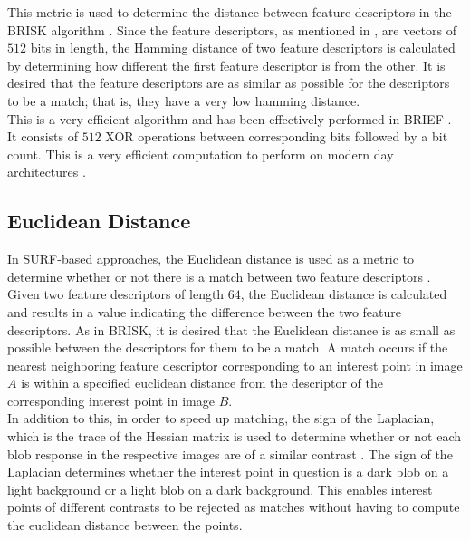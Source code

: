 \documentclass[11pt]{report}
\begin{document}
This metric is used to determine the distance between feature descriptors in the BRISK algorithm \cite{Leutenegger2011}. Since the feature descriptors, as mentioned in , are vectors of $512$ bits in length, the Hamming distance of two feature descriptors is calculated by determining how different the first feature descriptor is from the other. It is desired that the feature descriptors are as similar as possible for the descriptors to be a match; that is, they have a very low hamming distance. \\

This is a very efficient algorithm and has been effectively performed in BRIEF \cite{Calonder}. It consists of $512$ XOR operations between corresponding bits followed by a bit count. This is a very efficient computation to perform on modern day architectures \cite{Leutenegger2011}. \\ 

\subsection{Euclidean Distance}
\label{sec:euclidean}
In SURF-based approaches,  the Euclidean distance is used as a metric to determine whether or not there is a match between two feature descriptors \cite{Lowe2004}. Given two feature descriptors of length $64$, the Euclidean distance is calculated and results in a value indicating the difference between the two feature descriptors. As in BRISK, it is desired that the Euclidean distance is as small as possible between the descriptors for them to be a match. A match occurs if the nearest neighboring feature descriptor corresponding to an interest point in image $A$ is within a specified euclidean distance from the descriptor of the corresponding interest point in image $B$.\\

In addition to this, in order to speed up matching, the sign of the Laplacian, which is the trace of the Hessian matrix is used to determine whether or not each blob response in the respective images are of a similar contrast \cite{Bay2008}. The sign of the Laplacian determines whether the interest point in question is a dark blob on a light background or a light blob on a dark background. This enables interest points of different contrasts to be rejected as matches without having to compute the euclidean distance between the points.\\
\end{document}
